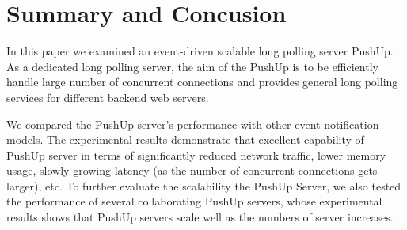\section{Summary and Concusion\\}

In this paper we examined an event-driven scalable long polling server PushUp.
As a dedicated long polling server, the aim of the PushUp is to be efficiently
handle large number of concurrent connections and provides general long 
polling services for different backend web servers.

We compared the PushUp server's performance with other event notification 
models. The experimental results demonstrate that excellent capability of 
PushUp server in terms of significantly reduced network traffic, lower memory 
usage, slowly growing latency (as the number of concurrent connections gets 
larger), etc. To further evaluate the scalability the PushUp Server, we also
tested the performance of several collaborating PushUp servers, whose 
experimental results shows that PushUp servers scale well as the numbers of
server increases.

